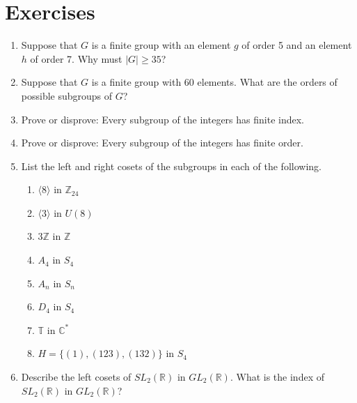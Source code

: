 
\section*{Exercises}
\exrule
 
{\small
\begin{enumerate}
 
\item
Suppose that $G$ is a finite group with an element $g$ of order 5 and an element $h$ of order 7. Why must $|G| \geq 35$?
 
\item
Suppose that $G$ is a finite group with 60 elements.  What are the orders of possible subgroups of $G$?
 
\item
Prove or disprove: Every subgroup of the integers has finite index.
 
\item
Prove or disprove: Every subgroup of the integers has finite order.

\item
List the left and right cosets of the subgroups in each of the following.
\begin{multicols}{2}
\begin{enumerate}

\item 
$\langle 8 \rangle$ in ${\mathbb Z}_{24}$

\item
$\langle 3 \rangle$ in $U(8)$

\item
$3 {\mathbb Z}$ in ${\mathbb Z}$

\item
$A_4$ in $S_4$

\item
$A_n$ in $S_n$

\item
$D_4$ in $S_4$

\item
${\mathbb T}$ in ${\mathbb C}^\ast$

\item
$H = \{ (1), (123), (132) \}$ in $S_4$

\end{enumerate}
\end{multicols}
 
\item
Describe the left cosets of $SL_2( {\mathbb R} )$ in $GL_2( {\mathbb R})$.   What is the index of $SL_2( {\mathbb R} )$ in $GL_2( {\mathbb R})$?


\end{enumerate}}
